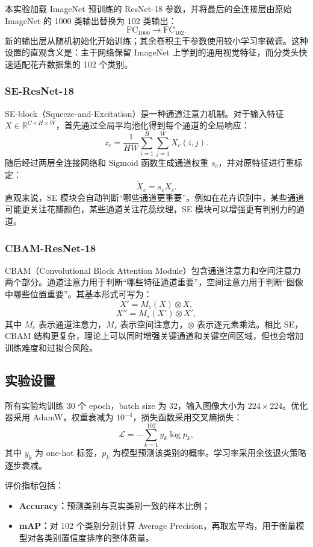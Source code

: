 \documentclass{article}
\begin{document}
本实验加载 ImageNet 预训练的 ResNet-18 参数，并将最后的全连接层由原始 ImageNet 的 1000 类输出替换为 102 类输出：
\[
    \mathrm{FC}_{1000} \rightarrow \mathrm{FC}_{102}.
\]
新的输出层从随机初始化开始训练；其余卷积主干参数使用较小学习率微调。这种设置的直观含义是：主干网络保留 ImageNet 上学到的通用视觉特征，而分类头快速适配花卉数据集的 102 个类别。

\subsubsection{SE-ResNet-18}
SE-block（Squeeze-and-Excitation）是一种通道注意力机制。对于输入特征 $X\in\mathbb{R}^{C\times H\times W}$，首先通过全局平均池化得到每个通道的全局响应：
\[
    z_c=\frac{1}{H W}\sum_{i=1}^{H}\sum_{j=1}^{W}X_c(i,j).
\]
随后经过两层全连接网络和 Sigmoid 函数生成通道权重 $s_c$，并对原特征进行重标定：
\[
    \widetilde{X}_c=s_c X_c.
\]
直观来说，SE 模块会自动判断“哪些通道更重要”。例如在花卉识别中，某些通道可能更关注花瓣颜色，某些通道关注花蕊纹理，SE 模块可以增强更有判别力的通道。

\subsubsection{CBAM-ResNet-18}
CBAM（Convolutional Block Attention Module）包含通道注意力和空间注意力两个部分。通道注意力用于判断“哪些特征通道重要”，空间注意力用于判断“图像中哪些位置重要”。其基本形式可写为：
\[
    X' = M_c(X)\otimes X,
\]
\[
    X'' = M_s(X')\otimes X',
\]
其中 $M_c$ 表示通道注意力，$M_s$ 表示空间注意力，$\otimes$ 表示逐元素乘法。相比 SE，CBAM 结构更复杂，理论上可以同时增强关键通道和关键空间区域，但也会增加训练难度和过拟合风险。

\subsection{实验设置}
所有实验均训练 30 个 epoch，batch size 为 32，输入图像大小为 $224\times224$。优化器采用 AdamW，权重衰减为 $10^{-4}$，损失函数采用交叉熵损失：
\[
    \mathcal{L}=-\sum_{k=1}^{102} y_k\log p_k,
\]
其中 $y_k$ 为 one-hot 标签，$p_k$ 为模型预测该类别的概率。学习率采用余弦退火策略逐步衰减。

评价指标包括：
\begin{itemize}
    \item \textbf{Accuracy：}预测类别与真实类别一致的样本比例；
    \item \textbf{mAP：}对 102 个类别分别计算 Average Precision，再取宏平均，用于衡量模型对各类别置信度排序的整体质量。
\end{itemize}
\end{document}
